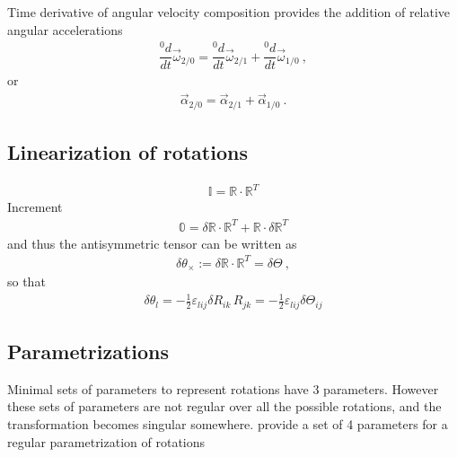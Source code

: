 \documentclass[letterpaper,10pt,english]{jupyterBook}
\begin{document}
\sphinxAtStartPar
{} Time derivative of angular velocity composition provides the addition of relative angular accelerations
\begin{equation*}
\begin{split}\dfrac{{}^0 d}{dt} \vec{\omega}_{2/0} = \dfrac{{}^0 d}{dt} \vec{\omega}_{2/1} + \dfrac{{}^0 d}{dt} \vec{\omega}_{1/0} \ ,\end{split}
\end{equation*}
\sphinxAtStartPar
or
\begin{equation*}
\begin{split}\vec{\alpha}_{2/0} = \vec{\alpha}_{2/1} + \vec{\alpha}_{1/0} \ .\end{split}
\end{equation*}

\subsection{Linearization of rotations}
\label{\detokenize{ch/kinematics-rotations:linearization-of-rotations}}\begin{equation*}
\begin{split}\mathbb{I} = \mathbb{R} \cdot \mathbb{R}^T\end{split}
\end{equation*}
\sphinxAtStartPar
Increment
\begin{equation*}
\begin{split}\mathbb{0} = \delta \mathbb{R} \cdot \mathbb{R}^T + \mathbb{R} \cdot \delta \mathbb{R}^T\end{split}
\end{equation*}
\sphinxAtStartPar
and thus the antisymmetric tensor can be written as
\begin{equation*}
\begin{split}\delta \theta_{\times} := \delta \mathbb{R} \cdot \mathbb{R}^T = \delta \mathbb{\Theta} \ ,\end{split}
\end{equation*}
\sphinxAtStartPar
so that
\begin{equation*}
\begin{split}\delta \theta_l = -\frac{1}{2} \varepsilon_{lij} \delta R_{ik} \, R_{jk} = - \frac{1}{2} \varepsilon_{lij} \delta \Theta_{ij}\end{split}
\end{equation*}

\subsection{Parametrizations}
\label{\detokenize{ch/kinematics-rotations:parametrizations}}\label{\detokenize{ch/kinematics-rotations:classical-mechanics-kinematics-rotations-param}}
\sphinxAtStartPar
Minimal sets of parameters to represent rotations have 3 parameters. However these sets of parameters are not regular over all the possible rotations, and the transformation becomes singular somewhere. {\hyperref[\detokenize{ch/kinematics-rotations:classical-mechanics-kinematics-rotations-param-quaternions}]{}} provide a set of 4 parameters for a regular parametrization of rotations
\end{document}
